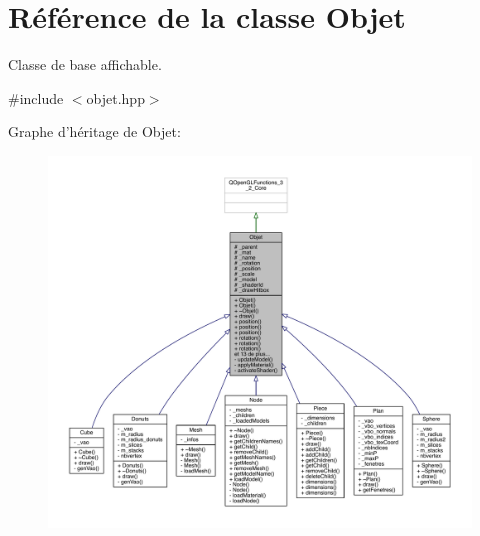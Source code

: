 \hypertarget{class_objet}{\section{Référence de la classe Objet}
\label{class_objet}
}


Classe de base affichable.  




{\ttfamily \#include $<$objet.\+hpp$>$}



Graphe d'héritage de Objet\+:
\nopagebreak
\begin{figure}[H]
\begin{center}
\leavevmode
\includegraphics[width=350pt]{class_objet__inherit__graph}
\end{center}
\end{figure}


